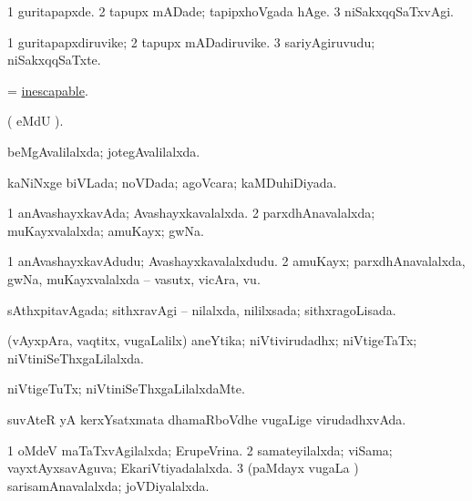 \bentry
{} 
\gl{\kirxvi}
\expl{}
\bmng
\bnum
\num{1} guritapapxde. 
\num{2} tapupx mADade; tapipxhoVgada hAge. 
\num{3} niSakxqqSaTxvAgi. 
\enum
\emng
\eentry

\bentry
{} 
\gl{\nA}
\expl{}
\bmng
\bnum
\num{1} guritapapxdiruvike; 
\num{2} tapupx mADadiruvike. 
\num{3} sariyAgiruvudu; niSakxqqSaTxte. 
\enum
\emng
\eentry

\bentry
{} 
\gl{\gu}
\expl{}
\bmng
 = \hyperref{kandict_i.pdf}{I}{inescapable}{inescapable}. 
\emng
\eentry

\bentry
{} 
\gl{\saMkiSx}
\expl{}
\bmng
( eMdU \parx).  
\emng
\eentry

\bentry
{} 
\gl{\gu}
\expl{}
\bmng
 beMgAvalilalxda; jotegAvalilalxda. 
\emng
\eentry

\bentry
{} 
\gl{\gu}
\expl{}
\bmng
 kaNiNxge biVLada; noVDada; agoVcara; kaMDuhiDiyada. 
\emng
\eentry

\bentry
{} 
\gl{\gu}
\expl{}
\bmng
\bnum
\num{1} anAvashayxkavAda; Avashayxkavalalxda. 
\num{2} parxdhAnavalalxda; muKayxvalalxda; amuKayx; gwNa. 
\enum
\emng
\eentry

\bentry
{} 
\gl{\nA}
\expl{}
\bmng
\bnum
\num{1} anAvashayxkavAdudu; Avashayxkavalalxdudu. 
\num{2} amuKayx; parxdhAnavalalxda, gwNa, muKayxvalalxda -- vasutx, vicAra, \mo vu. 
\enum
\emng
\eentry

\bentry
{} 
\gl{\gu}
\expl{}
\bmng
 sAthxpitavAgada; sithxravAgi -- nilalxda, nililxsada; sithxragoLisada. 
\emng
\eentry

\bentry
{} 
\gl{\gu}
\expl{}
\bmng
 (vAyxpAra, vaqtitx, \mo vugaLalilx) aneYtika; niVtivirudadhx; niVtigeTaTx; niVtiniSeThxgaLilalxda. 
\emng
\eentry

\bentry
{} 
\gl{\kirxvi}
\expl{}
\bmng
 niVtigeTuTx; niVtiniSeThxgaLilalxdaMte. 
\emng
\eentry

\bentry
{} 
\gl{\gu}
\expl{}
\bmng
 suvAteR yA kerxYsatxmata dhamaRboVdhe \mo vugaLige virudadhxvAda. 
\emng
\eentry

\bentry
{} 
\gl{\gu}
\expl{}
\bmng
\bnum
\num{1} oMdeV maTaTxvAgilalxda; ErupeVrina. 
\num{2} samateyilalxda; viSama; vayxtAyxsavAguva; EkariVtiyadalalxda. 
\num{3} (paMdayx \mo vugaLa \vi) sarisamAnavalalxda; joVDiyalalxda. 
\enum
\emng
\eentry

